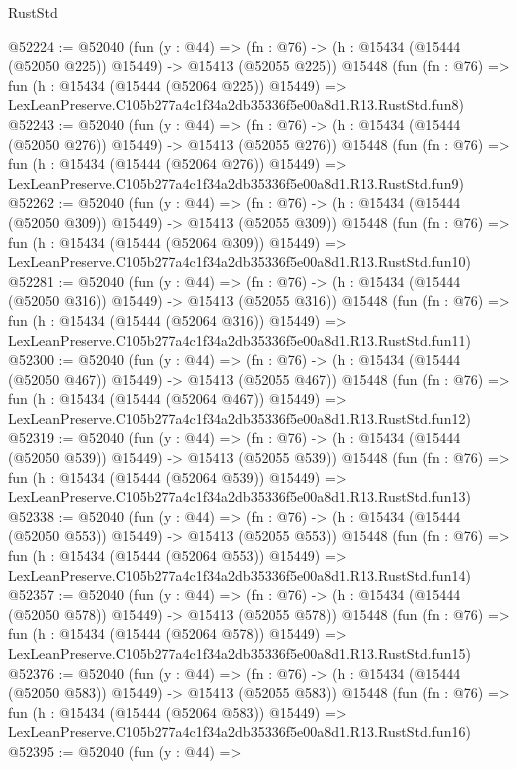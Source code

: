 \begin{lexlean}{RustStd}
\begin{coremodule}
@52224 := @52040
    (fun (y : @44) =>
    (fn : @76) -> (h : @15434 (@15444 (@52050 @225)) @15449) -> @15413 (@52055 @225))
    @15448
    (fun (fn : @76) =>
    fun (h : @15434 (@15444 (@52064 @225)) @15449) =>
    LexLeanPreserve.C105b277a4c1f34a2db35336f5e00a8d1.R13.RustStd.fun8)
@52243 := @52040
    (fun (y : @44) =>
    (fn : @76) -> (h : @15434 (@15444 (@52050 @276)) @15449) -> @15413 (@52055 @276))
    @15448
    (fun (fn : @76) =>
    fun (h : @15434 (@15444 (@52064 @276)) @15449) =>
    LexLeanPreserve.C105b277a4c1f34a2db35336f5e00a8d1.R13.RustStd.fun9)
@52262 := @52040
    (fun (y : @44) =>
    (fn : @76) -> (h : @15434 (@15444 (@52050 @309)) @15449) -> @15413 (@52055 @309))
    @15448
    (fun (fn : @76) =>
    fun (h : @15434 (@15444 (@52064 @309)) @15449) =>
    LexLeanPreserve.C105b277a4c1f34a2db35336f5e00a8d1.R13.RustStd.fun10)
@52281 := @52040
    (fun (y : @44) =>
    (fn : @76) -> (h : @15434 (@15444 (@52050 @316)) @15449) -> @15413 (@52055 @316))
    @15448
    (fun (fn : @76) =>
    fun (h : @15434 (@15444 (@52064 @316)) @15449) =>
    LexLeanPreserve.C105b277a4c1f34a2db35336f5e00a8d1.R13.RustStd.fun11)
@52300 := @52040
    (fun (y : @44) =>
    (fn : @76) -> (h : @15434 (@15444 (@52050 @467)) @15449) -> @15413 (@52055 @467))
    @15448
    (fun (fn : @76) =>
    fun (h : @15434 (@15444 (@52064 @467)) @15449) =>
    LexLeanPreserve.C105b277a4c1f34a2db35336f5e00a8d1.R13.RustStd.fun12)
@52319 := @52040
    (fun (y : @44) =>
    (fn : @76) -> (h : @15434 (@15444 (@52050 @539)) @15449) -> @15413 (@52055 @539))
    @15448
    (fun (fn : @76) =>
    fun (h : @15434 (@15444 (@52064 @539)) @15449) =>
    LexLeanPreserve.C105b277a4c1f34a2db35336f5e00a8d1.R13.RustStd.fun13)
@52338 := @52040
    (fun (y : @44) =>
    (fn : @76) -> (h : @15434 (@15444 (@52050 @553)) @15449) -> @15413 (@52055 @553))
    @15448
    (fun (fn : @76) =>
    fun (h : @15434 (@15444 (@52064 @553)) @15449) =>
    LexLeanPreserve.C105b277a4c1f34a2db35336f5e00a8d1.R13.RustStd.fun14)
@52357 := @52040
    (fun (y : @44) =>
    (fn : @76) -> (h : @15434 (@15444 (@52050 @578)) @15449) -> @15413 (@52055 @578))
    @15448
    (fun (fn : @76) =>
    fun (h : @15434 (@15444 (@52064 @578)) @15449) =>
    LexLeanPreserve.C105b277a4c1f34a2db35336f5e00a8d1.R13.RustStd.fun15)
@52376 := @52040
    (fun (y : @44) =>
    (fn : @76) -> (h : @15434 (@15444 (@52050 @583)) @15449) -> @15413 (@52055 @583))
    @15448
    (fun (fn : @76) =>
    fun (h : @15434 (@15444 (@52064 @583)) @15449) =>
    LexLeanPreserve.C105b277a4c1f34a2db35336f5e00a8d1.R13.RustStd.fun16)
@52395 := @52040
    (fun (y : @44) =>

\end{coremodule}
\end{lexlean}

